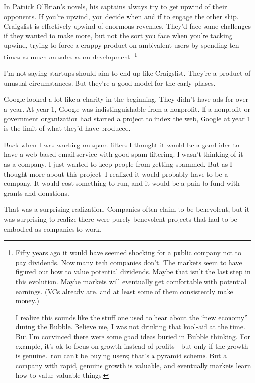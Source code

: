 In Patrick O'Brian's novels, his captains always try to get upwind of
their opponents. If you're upwind, you decide when and if to engage the
other ship. Craigslist is effectively upwind of enormous revenues.
They'd face some challenges if they wanted to make more, but not the
sort you face when you're tacking upwind, trying to force a crappy
product on ambivalent users by spending ten times as much on sales as on
development. \footnote{Fifty years ago it would have seemed shocking for a public
company not to pay dividends. Now many tech companies don't. The markets
seem to have figured out how to value potential dividends. Maybe that
isn't the last step in this evolution. Maybe markets will eventually get
comfortable with potential earnings. (VCs already are, and at least some
of them consistently make money.)

I realize this sounds like the stuff one used to hear about the ``new
economy'' during the Bubble. Believe me, I was not drinking that
kool-aid at the time. But I'm convinced there were some
\href{bubble.html}{good ideas} buried in Bubble thinking. For example,
it's ok to focus on growth instead of profits---but only if the growth
is genuine. You can't be buying users; that's a pyramid scheme. But a
company with rapid, genuine growth is valuable, and eventually markets
learn how to value valuable things.}

I'm not saying startups should aim to end up like Craigslist. They're a
product of unusual circumstances. But they're a good model for the early
phases.

Google looked a lot like a charity in the beginning. They didn't have
ads for over a year. At year 1, Google was indistinguishable from a
nonprofit. If a nonprofit or government organization had started a
project to index the web, Google at year 1 is the limit of what they'd
have produced.

Back when I was working on spam filters I thought it would be a good
idea to have a web-based email service with good spam filtering. I
wasn't thinking of it as a company. I just wanted to keep people from
getting spammed. But as I thought more about this project, I realized it
would probably have to be a company. It would cost something to run, and
it would be a pain to fund with grants and donations.

That was a surprising realization. Companies often claim to be
benevolent, but it was surprising to realize there were purely
benevolent projects that had to be embodied as companies to work.

